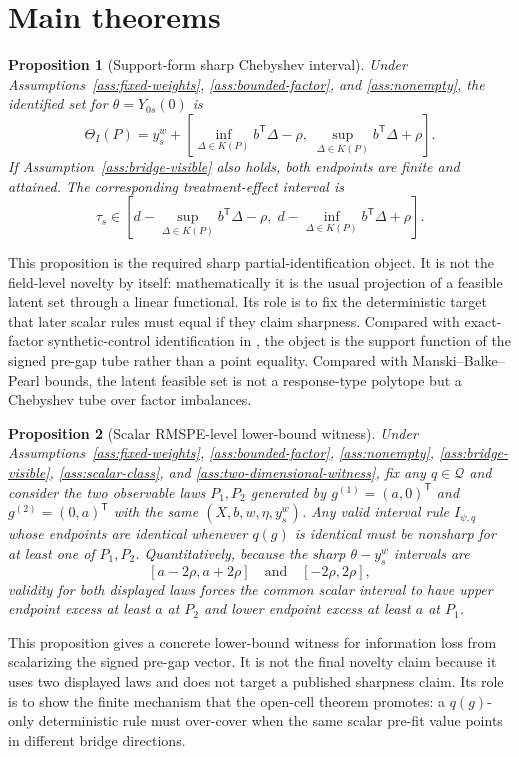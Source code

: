 \documentclass[11pt]{article}
\newcommand{\transpose}{\mathsf{T}}
\theoremstyle{definition}
\theoremstyle{plain}
\newtheorem{proposition}{Proposition}
\theoremstyle{remark}
\begin{document}
\section{Main theorems}
\begin{proposition}[Support-form sharp Chebyshev interval]\label{thm:sharp-chebyshev}
Under Assumptions~\ref{ass:fixed-weights}, \ref{ass:bounded-factor}, and
\ref{ass:nonempty}, the identified set for \(\theta=Y_{0s}(0)\) is
\[
\Theta_I(P)=
y_s^w+
\left[
\inf_{\Delta\in K(P)} b^\transpose\Delta-\rho,\;
\sup_{\Delta\in K(P)} b^\transpose\Delta+\rho
\right].
\]
If Assumption~\ref{ass:bridge-visible} also holds, both endpoints are finite
and attained.  The corresponding treatment-effect interval is
\[
\tau_s\in
\left[
d-\sup_{\Delta\in K(P)} b^\transpose\Delta-\rho,\;
d-\inf_{\Delta\in K(P)} b^\transpose\Delta+\rho
\right].
\]
\end{proposition}
This proposition is the required sharp partial-identification object.  It is
not the field-level novelty by itself: mathematically it is the usual projection
of a feasible latent set through a linear functional.  Its role is to fix the
deterministic target that later scalar rules must equal if they claim sharpness.
Compared with exact-factor synthetic-control identification in
\cite{AbadieDiamondHainmueller2010}, the object is the support function of the
signed pre-gap tube rather than a point equality.  Compared with
Manski--Balke--Pearl bounds, the latent feasible set is not a response-type
polytope but a Chebyshev tube over factor imbalances.

\begin{proposition}[Scalar RMSPE-level lower-bound witness]\label{thm:scalar-lower-bound}
Under Assumptions~\ref{ass:fixed-weights}, \ref{ass:bounded-factor},
\ref{ass:nonempty}, \ref{ass:bridge-visible}, \ref{ass:scalar-class}, and
\ref{ass:two-dimensional-witness}, fix any \(q\in\mathcal Q\) and consider the
two observable laws \(P_1,P_2\) generated by \(g^{(1)}=(a,0)^\transpose\) and
\(g^{(2)}=(0,a)^\transpose\) with the same \((X,b,w,\eta,y_s^w)\).  Any valid
interval rule \(I_{\psi,q}\) whose endpoints are identical whenever \(q(g)\) is
identical must be nonsharp for at least one of \(P_1,P_2\).  Quantitatively,
because the sharp \(\theta-y_s^w\) intervals are
\[
[a-2\rho,a+2\rho]\quad\text{and}\quad[-2\rho,2\rho],
\]
validity for both displayed laws forces the common scalar interval to have
upper endpoint excess at least \(a\) at \(P_2\) and lower endpoint excess at
least \(a\) at \(P_1\).
\end{proposition}
This proposition gives a concrete lower-bound witness for information loss from
scalarizing the signed pre-gap vector.  It is not the final novelty claim
because it uses two displayed laws and does not target a published sharpness
claim.  Its role is to show the finite mechanism that the open-cell theorem
promotes: a \(q(g)\)-only deterministic rule must over-cover when the same
scalar pre-fit value points in different bridge directions.
\end{document}
